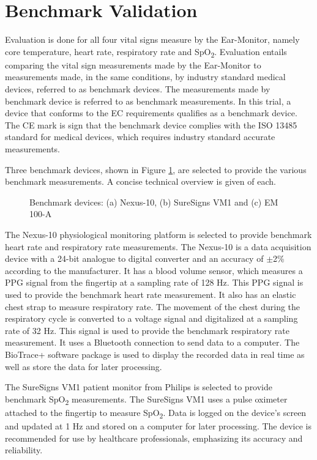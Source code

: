 \section{Benchmark Validation}
Evaluation is done for all four vital signs measure by the Ear-Monitor, namely core temperature, heart rate, respiratory rate and SpO\textsubscript{2}. Evaluation entails comparing the vital sign measurements made by the Ear-Monitor to measurements made, in the same conditions, by industry standard medical devices, referred to as benchmark devices. The measurements made by benchmark device is referred to as benchmark measurements. In this trial, a device that conforms to the EC requirements qualifies as a benchmark device. The CE mark is sign that the benchmark device complies with the ISO 13485 standard for medical devices, which requires industry standard accurate measurements.

\medskip

Three benchmark devices, shown in Figure \ref{fig:Benchmark}, are selected to provide the various benchmark measurements. A concise technical overview is given of each.

\begin{figure}[H]
\centering
\graphicspath{{figs/}}

\caption{Benchmark devices: (a) Nexus-10, (b) SureSigns VM1 and (c) EM 100-A}
\label{fig:Benchmark}
\end{figure}

The Nexus-10 physiological monitoring platform is selected to provide benchmark heart rate and respiratory rate measurements. The Nexus-10 is a data acquisition device with a 24-bit analogue to digital converter and an accuracy of $\pm$2\% according to the manufacturer. It has a blood volume sensor, which measures a PPG signal from the fingertip at a sampling rate of 128 Hz. This PPG signal is used to provide the benchmark heart rate measurement. It also has an elastic chest strap to measure respiratory rate. The movement of the chest during the respiratory cycle is converted to a voltage signal and digitalized at a sampling rate of 32 Hz. This signal is used to provide the benchmark respiratory rate measurement. It uses a Bluetooth connection to send data to a computer. The BioTrace+ software package is used to display the recorded data in real time as well as store the data for later processing.

\medskip

The SureSigns VM1 patient monitor from Philips is selected to provide benchmark SpO\textsubscript{2} measurements. The SureSigns VM1 uses a pulse oximeter attached to the fingertip to measure SpO\textsubscript{2}. Data is logged on the device's screen and updated at 1 Hz and stored on a computer for later processing. The device is recommended for use by healthcare professionals, emphasizing its accuracy and reliability.


